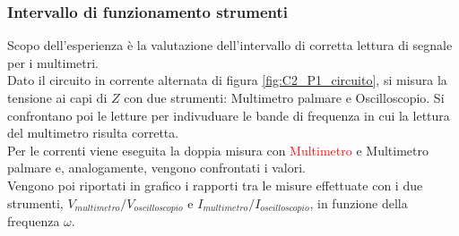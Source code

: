 \subsubsection{Intervallo di funzionamento strumenti}
Scopo dell'esperienza è la valutazione dell'intervallo di corretta lettura di segnale per i multimetri. \\
Dato il circuito in corrente alternata di figura \ref{fig:C2_P1_circuito}, si misura la tensione ai capi di $Z$ con due strumenti: Multimetro palmare e Oscilloscopio. Si confrontano poi le letture per indivuduare le bande di frequenza in cui la lettura del multimetro risulta corretta.\\
%
Per le correnti viene eseguita la doppia misura con \textcolor{red}{ Multimetro} e Multimetro palmare e, analogamente, vengono confrontati i valori.\\
%
Vengono poi riportati in grafico i rapporti tra le misure effettuate con i due strumenti, $V_{multimetro}/V_{oscilloscopio}$ e $I_{multimetro}/I_{oscilloscopio}$, in funzione della frequenza $\omega$.
%
